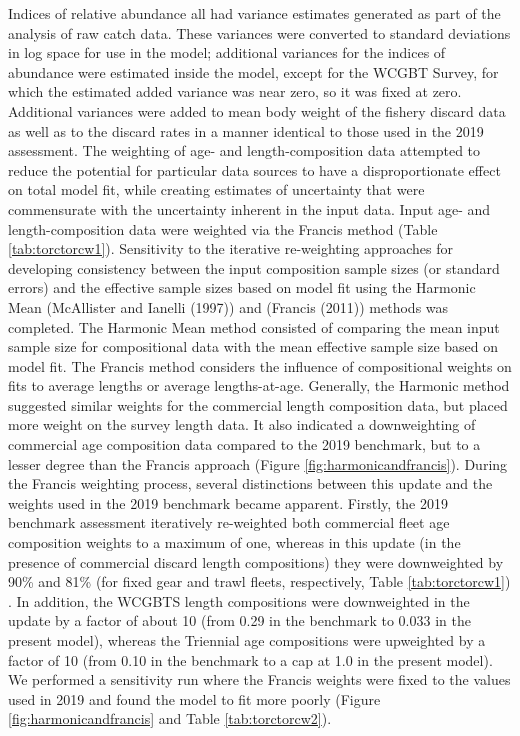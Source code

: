 \documentclass[11pt,
  english,
  a4paper,
]{article}
\begin{document}

Indices of relative abundance all had variance estimates generated as part of the analysis of raw catch data. These variances were converted to standard deviations in log space for use in the model; additional variances for the indices of abundance were estimated inside the model, except for the WCGBT Survey, for which the estimated added variance was near zero, so it was fixed at zero. Additional variances were added to mean body weight of the fishery discard data as well as to the discard rates in a manner identical to those used in the 2019 assessment. The weighting of age- and length-composition data attempted to reduce the potential for particular data sources to have a disproportionate effect on total model fit, while creating estimates of uncertainty that were commensurate with the uncertainty inherent in the input data. Input age- and length-composition data were weighted via the Francis method (Table \ref{tab:torctorcw1}). Sensitivity to the iterative re-weighting approaches for developing consistency between the input composition sample sizes (or standard errors) and the effective sample sizes based on model fit using the Harmonic Mean ({McAllister and Ianelli (1997)\leavevmode\tagmcend\tagstructend}) and ({Francis (2011)\leavevmode\tagmcend\tagstructend}) methods was completed. The Harmonic Mean method consisted of comparing the mean input sample size for compositional data with the mean effective sample size based on model fit. The Francis method considers the influence of compositional weights on fits to average lengths or average lengths-at-age. Generally, the Harmonic method suggested similar weights for the commercial length composition data, but placed more weight on the survey length data. It also indicated a downweighting of commercial age composition data compared to the 2019 benchmark, but to a lesser degree than the Francis approach (Figure \ref{fig:harmonicandfrancis}). During the Francis weighting process, several distinctions between this update and the weights used in the 2019 benchmark became apparent. Firstly, the 2019 benchmark assessment iteratively re-weighted both commercial fleet age composition weights to a maximum of one, whereas in this update (in the presence of commercial discard length compositions) they were downweighted by 90\% and 81\% (for fixed gear and trawl fleets, respectively, Table \ref{tab:torctorcw1}) . In addition, the WCGBTS length compositions were downweighted in the update by a factor of about 10 (from 0.29 in the benchmark to 0.033 in the present model), whereas the Triennial age compositions were upweighted by a factor of 10 (from 0.10 in the benchmark to a cap at 1.0 in the present model). We performed a sensitivity run where the Francis weights were fixed to the values used in 2019 and found the model to fit more poorly (Figure \ref{fig:harmonicandfrancis} and Table \ref{tab:torctorcw2}).
\end{document}
